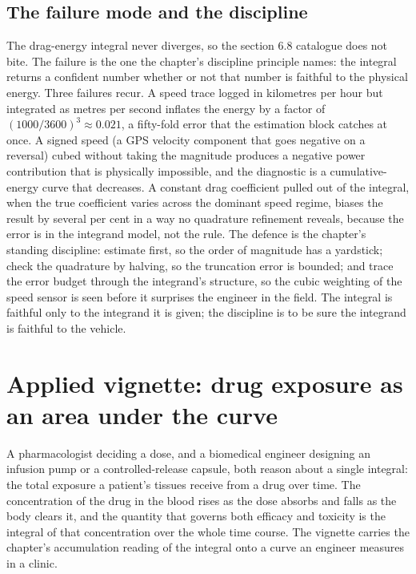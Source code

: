 \subsection{The failure mode and the discipline}

The drag-energy integral never diverges, so the section 6.8 catalogue
does not bite. The failure is the one the chapter's discipline
principle names: the integral returns a confident number whether or not
that number is faithful to the physical energy. Three failures recur.
A speed trace logged in kilometres per hour but integrated as metres
per second inflates the energy by a factor of $(1000/3600)^{3} \approx
0.021$, a fifty-fold error that the estimation block catches at once. A
signed speed (a GPS velocity component that goes negative on a reversal)
cubed without taking the magnitude produces a negative power
contribution that is physically impossible, and the diagnostic is a
cumulative-energy curve that decreases. A constant drag coefficient
pulled out of the integral, when the true coefficient varies across the
dominant speed regime, biases the result by several per cent in a way
no quadrature refinement reveals, because the error is in the integrand
model, not the rule. The defence is the chapter's standing discipline:
estimate first, so the order of magnitude has a yardstick; check the
quadrature by halving, so the truncation error is bounded; and trace
the error budget through the integrand's structure, so the cubic
weighting of the speed sensor is seen before it surprises the engineer
in the field. The integral is faithful only to the integrand it is
given; the discipline is to be sure the integrand is faithful to the
vehicle.

\section{Applied vignette: drug exposure as an area under the
curve}

A pharmacologist deciding a dose, and a biomedical engineer designing an
infusion pump or a controlled-release capsule, both reason about a single
integral: the total exposure a patient's tissues receive from a drug
over time. The concentration of the drug in the blood rises as the dose
absorbs and falls as the body clears it, and the quantity that governs
both efficacy and toxicity is the integral of that concentration over
the whole time course. The vignette carries the chapter's accumulation
reading of the integral onto a curve an engineer measures in a clinic.

